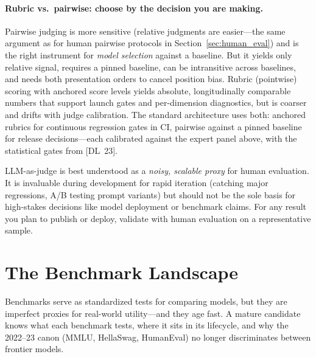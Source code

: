 \paragraph{Rubric vs.\ pairwise: choose by the decision you are making.}
Pairwise judging is more sensitive (relative judgments are easier---the same
argument as for human pairwise protocols in Section~\ref{sec:human_eval})
and is the right instrument for \emph{model selection} against a baseline.
But it yields only relative signal, requires a pinned baseline, can be
intransitive across baselines, and needs both presentation orders to cancel
position bias.  Rubric (pointwise) scoring with anchored score levels yields
absolute, longitudinally comparable numbers that support launch gates and
per-dimension diagnostics, but is coarser and drifts with judge calibration.
The standard architecture uses both: anchored rubrics for continuous
regression gates in CI, pairwise against a pinned baseline for release
decisions---each calibrated against the expert panel above, with the
statistical gates from [DL~23].

\begin{keyinsight}
LLM-as-judge is best understood as a \emph{noisy, scalable proxy} for human
evaluation.  It is invaluable during development for rapid iteration (catching
major regressions, A/B testing prompt variants) but should not be the sole
basis for high-stakes decisions like model deployment or benchmark claims.  For
any result you plan to publish or deploy, validate with human evaluation on
a representative sample.
\end{keyinsight}

\section{The Benchmark Landscape}
\label{sec:benchmarks}

Benchmarks serve as standardized tests for comparing models, but they are
imperfect proxies for real-world utility---and they age fast.  A mature
candidate knows what each benchmark tests, where it sits in its lifecycle,
and why the 2022--23 canon (MMLU, HellaSwag, HumanEval) no longer
discriminates between frontier models.

